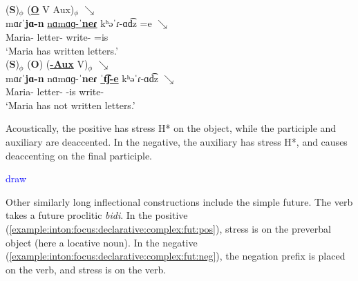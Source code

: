 \begin{exe}
	\ex \begin{xlist}
		\ex \glll   (\textbf{S})$_\phi$ (\underline{\textbf{O}} V Aux)$_\phi$ $\searrow$ \\
		mɑɾˈ\textbf{jɑ-n} \underline{nɑ{mɑɡ}-ˈ\textbf{neɾ}} kʰəˈɾ-ɑd͡z =e  $\searrow$ \\
		Maria-{} letter-{\pl} write-{\rptcp} =is \\
		\trans `Maria has written letters.' 
		\label{example:inton:focus:declarative:complex:periph:pos}
		\\ 
		\ex \glll   (\textbf{S})$_\phi$ ({\textbf{O}}) (\underline{\textbf{{\neggloss}-Aux}} V)$_\phi$ $\searrow$ \\
		mɑɾˈ\textbf{jɑ-n} {nɑ{mɑɡ}-ˈ\textbf{neɾ}} \underline{ˈ\textbf{t͡ʃ-e}} kʰəˈɾ-ɑd͡z   $\searrow$ \\
		Maria-{} letter-{\pl} {\neggloss}-is write-{\rptcp}  \\
		\trans `Maria has not written letters.' 
		\label{example:inton:focus:declarative:complex:periph:neg}
		\\ 
		
	\end{xlist}
\end{exe}

Acoustically, the positive has stress H* on the object, while the participle and auxiliary are deaccented. In the negative, the auxiliary has stress H*, and causes deaccenting on the final participle. 

\textcolor{blue}{draw}

Other similarly long inflectional constructions include the simple future. The verb takes a future proclitic \textit{bidi}. In the positive (\ref{example:inton:focus:declarative:complex:fut:pos}), stress is on the preverbal object (here a locative noun). In the negative (\ref{example:inton:focus:declarative:complex:fut:neg}), the negation prefix is placed on the verb, and stress is on the verb. 


